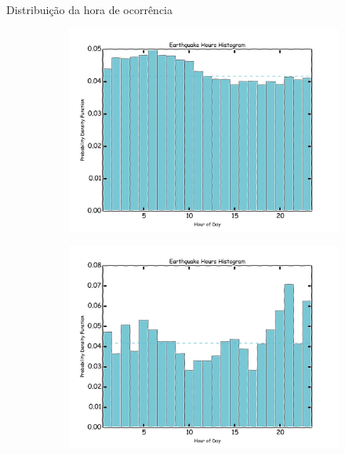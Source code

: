 \documentclass[ucs,8pt]{beamer}
\begin{document}
\begin{frame}{Distribuição da hora de ocorrência}
\begin{figure}[H]
	\centering
 	\begin{subfigure}[t]{0.45\textwidth}
		  	\centering
			\includegraphics[width=1.00\textwidth]{hmtk_sa3_hour}
			\label{fig:sa_hour_hist}
	\end{subfigure}%
	\quad %
	\begin{subfigure}[t]{0.45\textwidth}
		  	\centering
			\includegraphics[width=1.00\textwidth]{hmtk_bsb2013_hour}
			\label{fig:br_hour_hist}
    \end{subfigure}%
  \label{fig:qc_histograms} 
\end{figure}
\end{frame}
\end{document}
